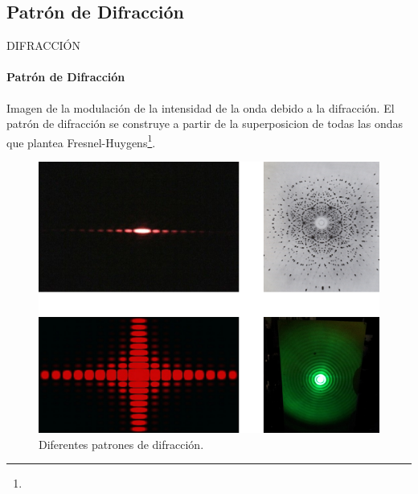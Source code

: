 \subsection{Patrón de Difracción}
\begin{frame}{DIFRACCIÓN}
    \framesubtitle{Patrón de Difracción}
    Imagen de la modulación de la intensidad de la onda debido a la difracción.  El patrón de difracción se construye a partir de la superposicion de todas las ondas que plantea Fresnel-Huygens\footnote{}.
    \begin{figure}
        \centering
        \includegraphics[scale=0.295]{david/Diff.png}
        \caption{Diferentes patrones de difracción.}
    \end{figure}
    \vspace{-2cm}
\end{frame}

